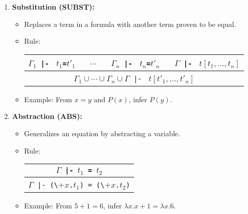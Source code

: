 \begin{enumerate}
    \item \textbf{Substitution (SUBST):}
    \begin{itemize}
        \item Replaces a term in a formula with another term proven to be equal.
        \item Rule:
          \begin{center}
            \begin{tabular}{c}
              $\Gamma_1${\small\verb+ |- +} $t_1${\small\verb+=+}$t'_1$ {\small\verb+  +} $\cdots$ {\small\verb+  +}
              $\Gamma_n${\small\verb+ |- +} $t_n${\small\verb+=+}$t'_n$ {\small\verb+  +}
              $\Gamma${\small\verb+ |- +} $t[t_1,\ldots,t_n]$ \\ \hline
              $\Gamma_1 \cup \cdots
              \cup \Gamma_n \cup \Gamma${\small\verb+ |- +} $t[t'_1,\ldots,t'_n]$ \\
            \end{tabular}
          \end{center}
        \item Example: From $x = y$ and $P(x)$, infer $P(y)$.
    \end{itemize}

    \item \textbf{Abstraction (ABS):}
    \begin{itemize}
        \item Generalizes an equation by abstracting a variable.
        \item Rule:
          \begin{center}
            \begin{tabular}{c}
              $\Gamma${\small\verb+ |- +}$t_1${\small\verb+ = +}$t_2$ \\ \hline
              $\Gamma${\small\verb+ |- (\+}$x${\small\verb+.+}$t_1${\small\verb+) = (\+}$x${\small\verb+.+}$t_2${\small\verb+)+} \\
            \end{tabular}
          \end{center}
        \item Example: From $5 + 1 = 6$, infer $\lambda x. x + 1 = \lambda x. 6$.
    \end{itemize}


\end{enumerate}
